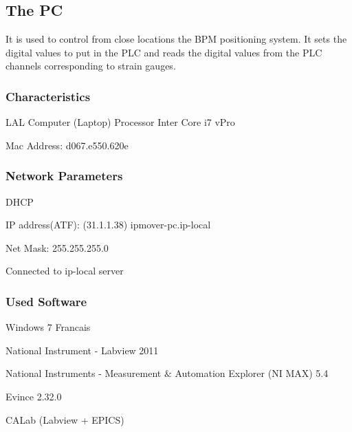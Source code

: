 \subsection{The PC}
It is used to control from close locations the BPM positioning system. It sets the digital values to put in the PLC and reads the digital values from the PLC channels corresponding to strain gauges.\par
\subsubsection{Characteristics}
LAL Computer (Laptop)
Processor Inter Core i7 vPro\par
Mac Address: d067.e550.620e\par
\subsubsection{Network Parameters}
DHCP\par
IP address(ATF): (31.1.1.38) ipmover-pc.ip-local\par
Net Mask: 255.255.255.0\par
Connected to ip-local server\par
\subsubsection{Used Software}
Windows 7 Francais\par
National Instrument - Labview 2011\par
National Instruments - Measurement $\&$ Automation Explorer (NI MAX) 5.4\par
Evince 2.32.0\par
CALab (Labview + EPICS) \cite{CALab}\par

